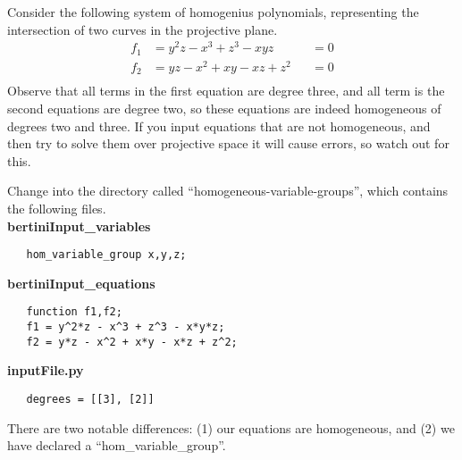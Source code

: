 \documentclass[12pt]{article}
\theoremstyle{definition}
\begin{document}
Consider the following system of homogenius polynomials, representing 
the intersection of two curves in the projective plane.
\begin{align*}
   f_1 &= y^2z - x^3 + z^3 - xyz &&= 0\\
   f_2 &= yz - x^2 + xy - xz + z^2 &&= 0\\
\end{align*}
Observe that all terms in the first equation are degree three, and all 
term is the second equations are degree two, so these equations are 
indeed homogeneous of degrees two and three. If you input equations that 
are not homogeneous, and then try to solve them over projective space it 
will cause errors, so watch out for this.

Change into the directory 
called ``homogeneous-variable-groups'', which contains the following 
files.\\

\noindent \textbf{bertiniInput\_variables}
\begin{leftbar}
\vspace{-10pt} 
\begin{verbatim}
   hom_variable_group x,y,z;
\end{verbatim}\vspace{-10pt} 
\end{leftbar}

\noindent \textbf{bertiniInput\_equations}
\begin{leftbar}
\vspace{-10pt} 
\begin{verbatim}
   function f1,f2;
   f1 = y^2*z - x^3 + z^3 - x*y*z;
   f2 = y*z - x^2 + x*y - x*z + z^2;
\end{verbatim}\vspace{-10pt} 
\end{leftbar}


\noindent \textbf{inputFile.py}
\begin{leftbar}
\vspace{-10pt} 
\begin{verbatim}
   degrees = [[3], [2]]
\end{verbatim}\vspace{-10pt} 
\end{leftbar}

There are two notable differences: (1) our equations are homogeneous, and 
(2) we have declared a ``hom\_variable\_group''.
\end{document}
